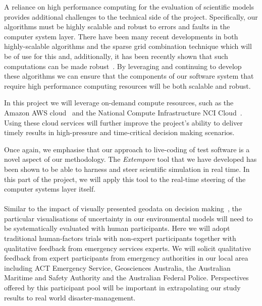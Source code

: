 \documentclass[a4paper,fontsize=13pt]{scrartcl}
\begin{document}
A reliance on high performance computing for the evaluation of scientific 
models provides additional challenges to the technical side of the project. 
Specifically, our algorithms must be highly scalable and robust to errors and faults in the computer system layer.
There have been many recent developments in both highly-scalable algorithms 
and the sparse grid combination technique which will be of use for this and,
additionally, it has been recently shown that such computations can be made robust~\parencite{HardingHLS2015,AliEtal2015}.
By leveraging and continuing to develop these algorithms we can ensure that
the components of our software system that require high performance 
computing resources will be both scalable and robust.

In this project we will leverage on-demand compute resources, such as
the Amazon AWS cloud~\parencite{amazon_aws} and the National Compute
Infrastructure NCI Cloud~\parencite{nci_cloud}. Using these cloud
services will further improve the project's ability to deliver timely
results in high-pressure and time-critical decision making scenarios.

Once again, we emphasise that our approach to live-coding of test software is a novel aspect of our methodology. The {\em Extempore} tool that we have developed has been shown to be able to harness and steer scientific simulation in real time. In this part of the project, we will apply this tool to the real-time steering of the computer systems layer itself.\\


\\

Similar to the impact of visually presented geodata on decision making~\parencite{kinkeldey2015evaluating}, the particular visualisations of 
uncertainty in our environmental models will need to be systematically evaluated with 
human participants. Here we will adopt traditional human-factors trials with non-expert participants together with qualitative feedback from emergency services experts. We will solicit qualitative feedback from expert participants from emergency authorities in our local area including ACT Emergency Service, Geosciences Australia, the Australian Maritime and Safety Authority and the Australian Federal Police. Perspectives offered by this participant pool will be important in extrapolating our study results to real world disaster-management. 
\end{document}
